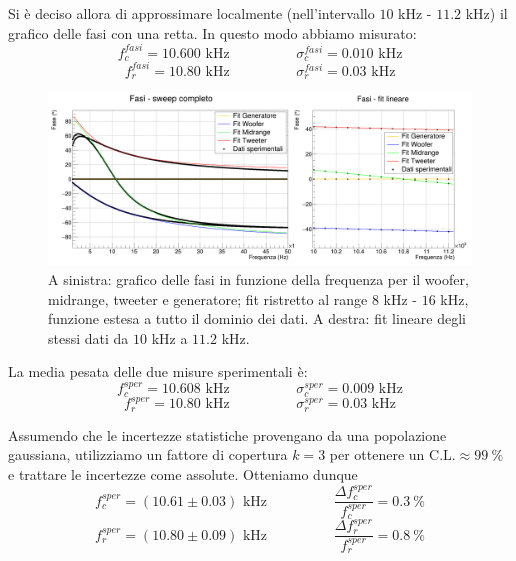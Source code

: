 \documentclass[12pt,italian]{article}
\begin{document}
\noindent
Si è deciso allora di approssimare localmente (nell'intervallo $10$ kHz -
$11.2$ kHz) il grafico delle fasi con una retta. In questo modo abbiamo
misurato:
\begin{equation*}
	f_{c}^{fasi} = 10.600 \text{ kHz}  \hspace{2cm}  \sigma_c^{fasi} = 0.010 \text{ kHz}
\end{equation*}
\begin{equation*}
	f_{r}^{fasi} = 10.80 \text{ kHz}  \hspace{2cm}  \sigma_r^{fasi} = 0.03 \text{ kHz}
\end{equation*}

\begin{figure}[h]
	\centering
	\includegraphics[width=\textwidth]{fig_fase.png}
	\caption{A sinistra: grafico delle fasi in funzione della frequenza per il woofer, midrange, tweeter e generatore;
		fit ristretto al range $8$ kHz - $16$ kHz, funzione estesa a tutto il dominio dei dati. A destra: fit lineare degli stessi dati da $10$ kHz a $11.2$ kHz.}\label{fig:phase_sweep}
\end{figure}

La media pesata delle due misure sperimentali è:
\begin{equation*}
	f_{c}^{sper} = 10.608 \text{ kHz}  \hspace{2cm}  \sigma_c^{sper} = 0.009 \text{ kHz}
\end{equation*}
\begin{equation*}
	f_{r}^{sper} = 10.80 \text{ kHz}  \hspace{2cm}  \sigma_r^{sper} = 0.03  \text{ kHz}
\end{equation*}

\noindent
Assumendo che le incertezze statistiche provengano da una popolazione
gaussiana, utilizziamo un fattore di copertura $k = 3$ per ottenere un
$\text{C.L.}\approx 99 \ \% $ e trattare le incertezze come assolute. Otteniamo
dunque
\begin{equation*}
	f_{c}^{sper} = (10.61 \pm 0.03) \text{ kHz} \hspace{2cm} \frac{\Delta f_{c}^{sper}}{f_{c}^{sper}} = 0.3 \ \%
\end{equation*}
\begin{equation*}
	f_{r}^{sper} = (10.80 \pm 0.09) \text{ kHz} \hspace{2cm} \frac{\Delta f_{r}^{sper}}{f_{r}^{sper}} = 0.8 \ \%
\end{equation*}
\end{document}
